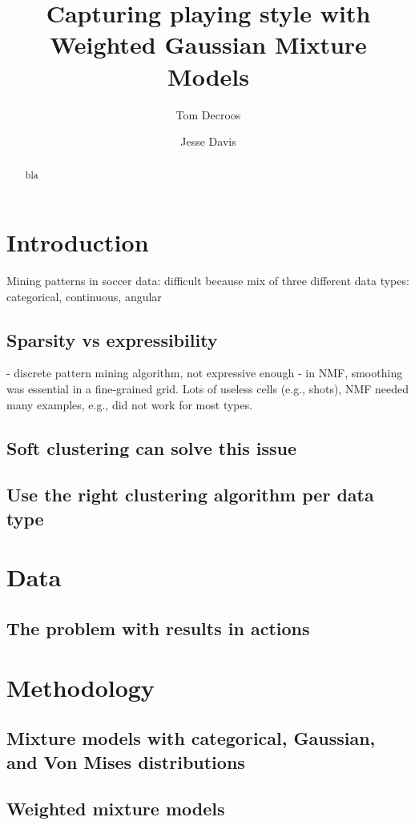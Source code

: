 \documentclass[runningheads]{llncs}
\title{Capturing playing style with Weighted Gaussian Mixture Models}
\author{Tom Decroos \and Jesse Davis}
\institute{KU Leuven, Department of Computer Science}
\date{}
\begin{document}
\maketitle

\begin{abstract}
	bla
\end{abstract}

\section{Introduction}
Mining patterns in  soccer data: difficult because mix of three different data types: categorical, continuous, angular
\subsection{Sparsity vs expressibility}
- discrete pattern mining algorithm, not expressive enough
- in NMF, smoothing was essential in a fine-grained grid. Lots of useless cells (e.g., shots), NMF needed many examples, e.g., did not work for most types.

\subsection{Soft clustering can solve this issue}
\subsection{Use the right clustering algorithm per data type}

\section{Data}
\subsection{The problem with results in actions}
\section{Methodology}
\subsection{Mixture models with categorical, Gaussian, and Von Mises distributions}
\subsection{Weighted mixture models}
\end{document}
